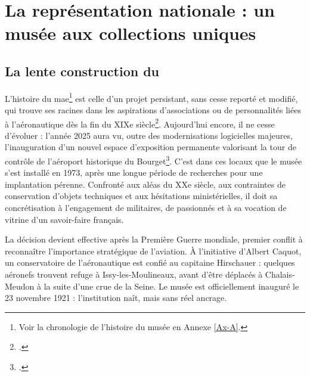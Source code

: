 %

\section{\label{I-A-1}La représentation nationale : un musée aux collections uniques}

\subsection{La lente construction du \mae}

L’histoire du \acf{mae}\footnote{Voir la chronologie de l'histoire du musée en Annexe \ref{Ax-A}.} est celle d’un projet persistant, sans cesse reporté et modifié, qui trouve ses racines dans les aspirations d'associations ou de personnalités liées à l'aéronautique dès la fin du XIXe siècle\footcite{terrierAeroportParisBourget2019}. Aujourd'hui encore, il ne cesse d'évoluer : l’année 2025 aura vu, outre des modernisations logicielles majeures, l'inauguration d’un nouvel espace d’exposition permanente valorisant la tour de contrôle de l’aéroport historique du Bourget\footcite{museedelairetdelespaceHallNavigationAerienne2025}. C’est dans ces locaux que le musée s’est installé en 1973, après une longue période de recherches pour une implantation pérenne. Confronté aux aléas du XXe siècle, aux contraintes de conservation d’objets techniques et aux hésitations ministérielles, il doit sa concrétisation à l’engagement de militaires, de passionnés et à sa vocation de vitrine d’un savoir-faire français.

La décision devient effective après la Première Guerre mondiale, premier conflit à reconnaître l’importance stratégique de l’aviation. À l’initiative d’Albert Caquot, un conservatoire de l’aéronautique est confié au capitaine Hirschauer : quelques aéronefs trouvent refuge à Issy-les-Moulineaux, avant d’être déplacés à Chalais-Meudon à la suite d’une crue de la Seine. Le musée est officiellement inauguré le 23 novembre 1921 : l’institution naît, mais sans réel ancrage.

